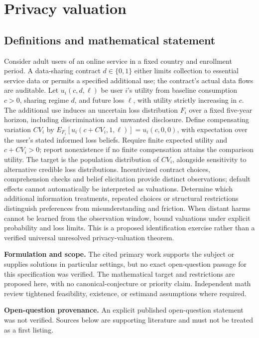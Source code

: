 \documentclass[11pt]{article}
\begin{document}
\section*{Privacy valuation}\label{30007688}
\subsection{Definitions and mathematical statement}
Consider adult users of an online service in a fixed country and enrollment period. A data-sharing contract \(d\in\{0,1\}\) either limits collection to essential service data or permits a specified additional use; the contract's actual data flows are auditable. Let \(u_i(c,d,\ell)\) be user \(i\)'s utility from baseline consumption \(c>0\), sharing regime \(d\), and future loss \(\ell\), with utility strictly increasing in \(c\). The additional use induces an uncertain loss distribution \(F_i\) over a fixed five-year horizon, including discrimination and unwanted disclosure. Define compensating variation \(CV_i\) by \(E_{F_i}[u_i(c+CV_i,1,\ell)]=u_i(c,0,0)\), with expectation over the user's stated informed loss beliefs. Require finite expected utility and \(c+CV_i>0\); report nonexistence if no finite compensation attains the comparison utility. The target is the population distribution of \(CV_i\), alongside sensitivity to alternative credible loss distributions. Incentivized contract choices, comprehension checks and belief elicitation provide distinct observations; default effects cannot automatically be interpreted as valuations. Determine which additional information treatments, repeated choices or structural restrictions distinguish preferences from misunderstanding and friction. When distant harms cannot be learned from the observation window, bound valuations under explicit probability and loss limits. This is a proposed identification exercise rather than a verified universal unresolved privacy-valuation theorem.

\par\textbf{Formulation and scope.} The cited primary work supports the subject or supplies solutions in particular settings, but no exact open-question passage for this specification was verified. The mathematical target and restrictions are proposed here, with no canonical-conjecture or priority claim. Independent math review tightened feasibility, existence, or estimand assumptions where required.

\par\textbf{Open-question provenance.} An explicit published open-question statement was not verified. Sources below are supporting literature and must not be treated as a first listing.
\end{document}
